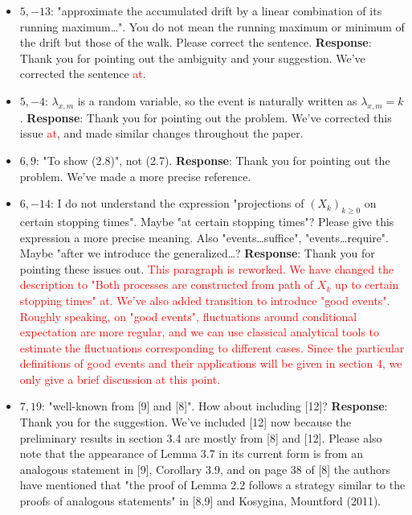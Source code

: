 \documentclass[11pt,a4paper]{article}
\numberwithin{equation}{section}
\def\TBF#1{\textcolor{red}{#1}} %
\begin{document}
\begin{itemize}
		
		\item 
		$5,-13$: "approximate the accumulated drift by a linear combination of its running maximum\dots". You do not mean the running maximum or minimum of the drift but those of the walk. Please correct the sentence.
		\subitem \textbf{Response}:
		Thank you for pointing out the ambiguity and your suggestion. We've corrected the sentence \TBF{at}.
		
		
		\item 
		$5,-4$: $\lambda_{x,m}$ is a random variable, so the event is naturally written as $\lambda_{x,m} = k$.
		\subitem \textbf{Response}:
		Thank you for pointing out the problem. We've corrected this issue \TBF{at}, and made similar changes throughout the paper.
		
		\item 
		$6,9$: "To show (2.8)", not (2.7).
		\subitem \textbf{Response}:
		Thank you for pointing out the problem. We've made a more precise reference.
		
		\item 
		$6,-14$: I do not understand the expression "projections of $(X_k)_{k\geq 0}$ on certain stopping times". Maybe "at certain stopping times"? Please give this expression a more precise meaning. Also "events\dots suffice", "events\dots require". Maybe "after we introduce the generalized\dots?
		\subitem \textbf{Response}:
		Thank you for pointing these issues out. \TBF{This paragraph is reworked. We have changed the description to "Both processes are constructed from path of $X_k$ up to certain stopping times" \TBF{at}. We've also added transition to introduce "good events". Roughly speaking, on "good events", fluctuations around conditional expectation are more regular, and we can use classical analytical tools to estimate the fluctuations corresponding to different cases. Since the particular definitions of good events and their applications will be given in section 4, we only give a brief discussion at this point.}
		
		\item 
		$7,19$: "well-known from [9] and [8]". How about including [12]?
		\subitem \textbf{Response}: Thank you for the suggestion. We've included [12] now because the preliminary results in section 3.4 are mostly from [8] and [12].
		Please also note that the appearance of Lemma 3.7 in its current form is from an analogous statement in [9], Corollary 3.9, and on page 38 of [8] the authors have mentioned that "the proof of Lemma 2.2 follows a strategy similar to the proofs of analogous statements" in [8,9] and Kosygina, Mountford (2011).
		

\end{itemize}
\end{document}
